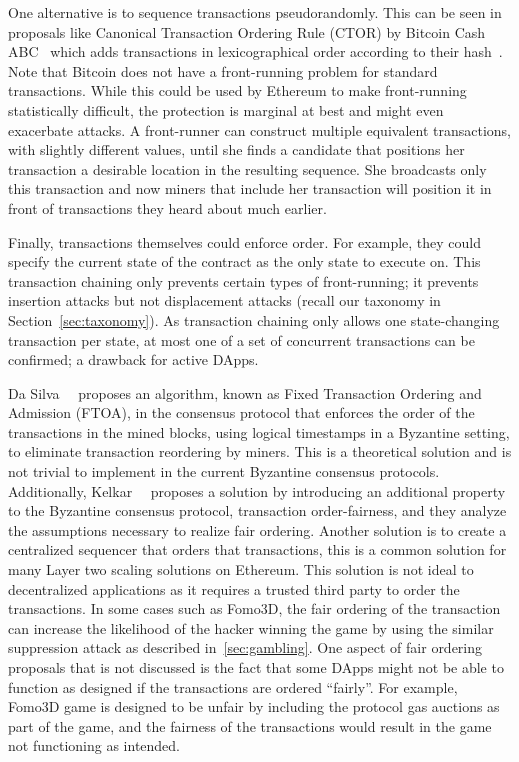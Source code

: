 One alternative is to sequence transactions pseudorandomly. This can be seen in proposals like Canonical Transaction Ordering Rule (CTOR) by Bitcoin Cash ABC~\cite{bitcoincashabcFork} which adds transactions in lexicographical order according to their hash~\cite{bitcoinABC2018CTOR}. Note that Bitcoin does not have a front-running problem for standard transactions. While this could be used by Ethereum to make front-running statistically difficult, the protection is marginal at best and might even exacerbate attacks. A front-runner can construct multiple equivalent transactions, with slightly different values, until she finds a candidate that positions her transaction a desirable location in the resulting sequence. She broadcasts only this transaction and now miners that include her transaction will position it in front of transactions they heard about much earlier.


Finally, transactions themselves could enforce order. For example, they could specify the current state of the contract as the only state to execute on. This transaction chaining only prevents certain types of front-running; \ie it prevents insertion attacks but not displacement attacks (recall our taxonomy in Section~\ref{sec:taxonomy}). As transaction chaining only allows one state-changing transaction per state, at most one of a set of concurrent transactions can be confirmed; a drawback for active DApps.

Da Silva~\etal~\cite{da2019fixed} proposes an algorithm, known as Fixed Transaction Ordering and Admission (FTOA), in the consensus protocol that enforces the order of the transactions in the mined blocks, using logical timestamps in a Byzantine setting, to eliminate transaction reordering by miners. This is a theoretical solution and is not trivial to implement in the current Byzantine consensus protocols. Additionally, Kelkar~\etal~\cite{kelkar2020order} proposes a solution by introducing an additional property to the Byzantine consensus protocol, transaction order-fairness, and they analyze the assumptions necessary to realize fair ordering. Another solution is to create a centralized sequencer that orders that transactions, this is a common solution for many Layer two scaling solutions on Ethereum. This solution is not ideal to decentralized applications as it requires a trusted third party to order the transactions. In some cases such as Fomo3D, the fair ordering of the transaction can increase the likelihood of the hacker winning the game by using the similar suppression attack as described in~\ref{sec:gambling}. One aspect of fair ordering proposals that is not discussed is the fact that some DApps might not be able to function as designed if the transactions are ordered ``fairly''. For example, Fomo3D game is designed to be unfair by including the protocol gas auctions as part of the game, and the fairness of the transactions would result in the game not functioning as intended. 

